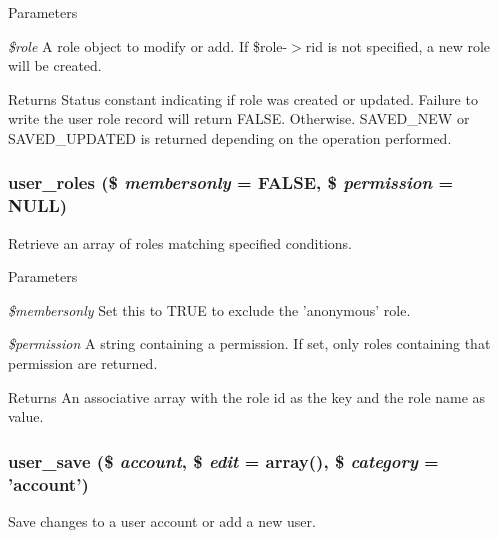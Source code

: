 \begin{DoxyParams}{Parameters}
\item[{\em \$role}]A role object to modify or add. If \$role-\/$>$rid is not specified, a new role will be created. \end{DoxyParams}
\begin{DoxyReturn}{Returns}
Status constant indicating if role was created or updated. Failure to write the user role record will return FALSE. Otherwise. SAVED\_\-NEW or SAVED\_\-UPDATED is returned depending on the operation performed. 
\end{DoxyReturn}
\hypertarget{user_8module_a2c97e1595e6af351e0ab7d60da180017}{
\subsubsection[{user\_\-roles}]{\setlength{\rightskip}{0pt plus 5cm}user\_\-roles (\$ {\em membersonly} = {\ttfamily FALSE}, \/  \$ {\em permission} = {\ttfamily NULL})}}
\label{user_8module_a2c97e1595e6af351e0ab7d60da180017}
Retrieve an array of roles matching specified conditions.


\begin{DoxyParams}{Parameters}
\item[{\em \$membersonly}]Set this to TRUE to exclude the 'anonymous' role. \item[{\em \$permission}]A string containing a permission. If set, only roles containing that permission are returned.\end{DoxyParams}
\begin{DoxyReturn}{Returns}
An associative array with the role id as the key and the role name as value. 
\end{DoxyReturn}
\hypertarget{user_8module_a857b652072abb243e0b44b02c3746a99}{
\subsubsection[{user\_\-save}]{\setlength{\rightskip}{0pt plus 5cm}user\_\-save (\$ {\em account}, \/  \$ {\em edit} = {\ttfamily array()}, \/  \$ {\em category} = {\ttfamily 'account'})}}
\label{user_8module_a857b652072abb243e0b44b02c3746a99}
Save changes to a user account or add a new user.



